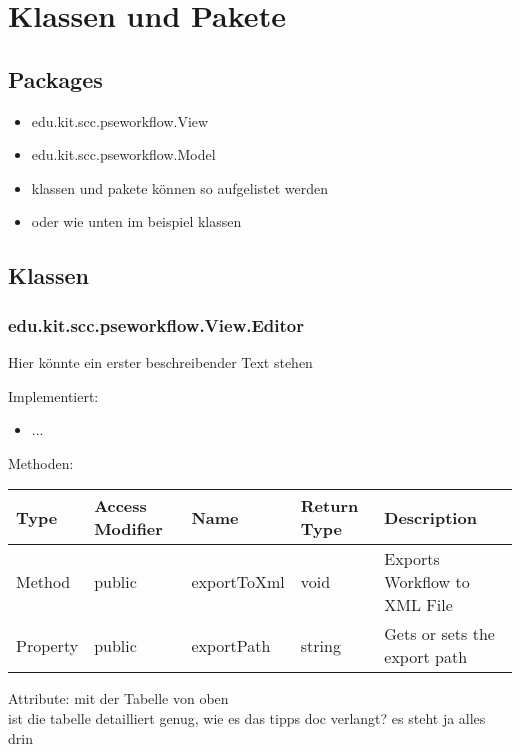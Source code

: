 \chapter{Klassen und Pakete}

    \section{Packages}
        \begin{itemize}
            \item edu.kit.scc.pseworkflow.View
            \item edu.kit.scc.pseworkflow.Model
            \item klassen und pakete können so aufgelistet werden
            \item oder wie unten im beispiel klassen
        \end{itemize}
        
    \section{Klassen}
    
        \subsection{edu.kit.scc.pseworkflow.View.Editor}
        
            Hier könnte ein erster beschreibender Text stehen
            
            Implementiert:
            \begin{itemize}
                \item ...
            \end{itemize}
            
            Methoden:
            \begin{center}
            \renewcommand{\arraystretch}{1.5}
                \begin{tabular}{|l|l|l|l|l|}
                    \hline 
                    \rowcolor[gray]{0.7}
                    Type & Access Modifier & Name & Return Type & Description \\ \hline 
                    Method & public & exportToXml & void & Exports Workflow to XML File \\ \hline
                    Property & public & exportPath & string & Gets or sets the export path \\
                    \hline
                \end{tabular}
            \end{center}
                
            Attribute:
            mit der Tabelle von oben \\
            ist die tabelle detailliert genug, wie es das tipps doc verlangt? es steht ja alles drin